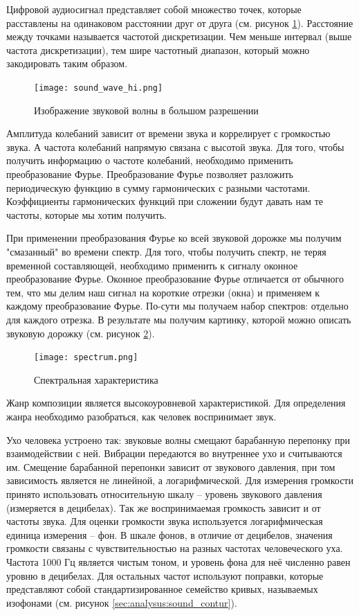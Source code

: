 Цифровой аудиосигнал представляет собой множество точек, которые расставлены на одинаковом расстоянии друг от друга (см. рисунок \ref{sec:analysus:sound_wave_hi}). Расстояние между точками называется частотой дискретизации. Чем меньше интервал (выше частота дискретизации), тем шире частотный диапазон, который можно закодировать таким образом.

\begin{figure}[t]
\centering
	\texttt{[image: sound\_wave\_hi.png]}
	\caption{Изображение звуковой волны в большом разрешении}
	\label{sec:analysus:sound_wave_hi}
\end{figure}

Амплитуда колебаний зависит от времени звука и коррелирует с громкостью звука. А частота колебаний напрямую связана с высотой звука. Для того, чтобы получить информацию о частоте колебаний, необходимо применить преобразование Фурье. Преобразование Фурье позволяет разложить периодическую функцию в сумму гармонических с разными частотами. Коэффициенты гармонических функций при сложении будут давать нам те частоты, которые мы хотим получить.

При применении преобразования Фурье ко всей звуковой дорожке мы получим "смазанный" во времени спектр. Для того, чтобы получить спектр, не теряя временной составляющей, необходимо применить к сигналу оконное преобразование Фурье. Оконное преобразование Фурье отличается от обычного тем, что мы делим наш сигнал на короткие отрезки (окна) и применяем к каждому преобразование Фурье. По-сути мы получаем набор спектров: отдельно для каждого отрезка. В результате мы получим картинку, которой можно описать звуковую дорожку (см. рисунок \ref{sec:analysus:spectrum}).

\begin{figure}[h]
\centering
	\texttt{[image: spectrum.png]}
	\caption{Спектральная характеристика}
	\label{sec:analysus:spectrum}
\end{figure}

Жанр композиции является высокоуровневой характеристикой. Для определения жанра необходимо разобраться, как человек воспринимает звук.

Ухо человека устроено так: звуковые волны смещают барабанную перепонку при взаимодействии с ней. Вибрации передаются во внутреннее ухо и считываются им. Смещение барабанной перепонки зависит от звукового давления, при том зависимость является не линейной, а логарифмической. Для измерения громкости принято использовать относительную шкалу -- уровень звукового давления (измеряется в децибелах). Так же воспринимаемая громкость зависит и от частоты звука. Для оценки громкости звука используется логарифмическая единица измерения -- фон. В шкале фонов, в отличие от децибелов, значения громкости связаны с чувствительностью на разных частотах человеческого уха. Частота 1000 Гц является чистым тоном, и уровень фона для неё численно равен уровню в децибелах. Для остальных частот используют поправки, которые представляют собой стандартизированное семейство кривых, называемых изофонами (см. рисунок \ref{sec:analysus:sound_contur}).

